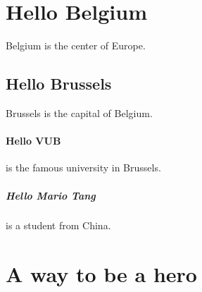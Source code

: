 \documentclass{article}
\begin{document}
\tableofcontents
\section{Hello Belgium}Belgium is the center of Europe.
\subsection{Hello Brussels} Brussels is the capital of Belgium.
\paragraph{Hello VUB}is the famous university in Brussels.
\subparagraph{Hello Mario Tang}is a student from China.
\section{A way to be a hero}
\end{document}
